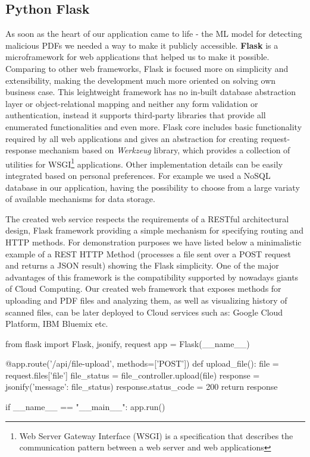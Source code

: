 \subsection{Python Flask}
As soon as the heart of our application came to life - the ML model for detecting malicious PDFs we needed a way to make it publicly accessible. \textbf{Flask} is a microframework for web applications that helped us to make it possible. Comparing to other web frameworks, Flask is focused more on simplicity and extensibility, making the development much more oriented on solving own business case. This leightweight framework has no in-built database abstraction layer or object-relational mapping and neither any form validation or authentication, instead it supports third-party libraries that provide all enumerated functionalities and even more. Flask core includes basic functionality required by all web applications and gives an abstraction for creating request-response mechanism based on \textit{Werkzeug} library, which provides a collection of utilities for WSGI\footnote{Web Server Gateway Interface (WSGI) is a specification that describes the communication pattern between a web server and web applications} applications. Other implementation details can be easily integrated based on personal preferences. For example we used a NoSQL database in our application, having the possibility to choose from a large variaty of available mechanisms for data storage. \par
The created web service respects the requirements of a RESTful architectural design, Flask framework providing a simple mechanism for specifying routing and HTTP methods. For demonstration purposes we have listed below a minimalistic example of a REST HTTP Method (processes a file sent over a POST request and returns a JSON result) showing the Flask simplicity. One of the major advantages of this framework is the compatibility supported by nowadays giants of Cloud Computing. Our created web framework that exposes methods for uploading and PDF files and analyzing them, as well as visualizing history of scanned files, can be later deployed to Cloud services such as: Google Cloud Platform, IBM Bluemix etc. \\ 

\begin{python}
from flask import Flask, jsonify, request
app = Flask(__name__)

@app.route('/api/file-upload', methods=['POST'])
def upload_file():
	file = request.files['file']
	file_status = file_controller.upload(file)
	response = jsonify({'message': file_status})
	response.status_code = 200
	return response

if __name__ == "__main__":
    app.run()
\end{python}


